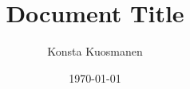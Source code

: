 \documentclass[11pt,a4paper]{article}
\title{Document Title}
\author{Konsta Kuosmanen}
\date{\today}
\begin{document}
\maketitle

\pagebreak

\tableofcontents

\pagebreak

\end{document}
